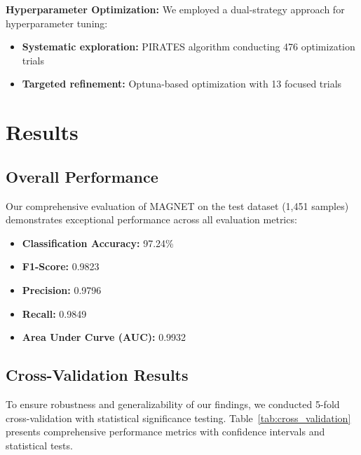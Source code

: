 \documentclass[a4paper,11pt]{article}
\begin{document}
\textbf{Hyperparameter Optimization:}
We employed a dual-strategy approach for hyperparameter tuning:
\begin{itemize}
  \item \textbf{Systematic exploration:} PIRATES algorithm conducting 476 optimization trials
  \item \textbf{Targeted refinement:} Optuna-based optimization with 13 focused trials
\end{itemize}

\section{Results}
\subsection{Overall Performance}
Our comprehensive evaluation of MAGNET on the test dataset (1,451 samples) demonstrates exceptional performance across all evaluation metrics:
\begin{itemize}
    \item \textbf{Classification Accuracy:} 97.24\%
    \item \textbf{F1-Score:} 0.9823
    \item \textbf{Precision:} 0.9796
    \item \textbf{Recall:} 0.9849
    \item \textbf{Area Under Curve (AUC):} 0.9932
\end{itemize}

\subsection{Cross-Validation Results}
To ensure robustness and generalizability of our findings, we conducted 5-fold cross-validation with statistical significance testing. Table~\ref{tab:cross_validation} presents comprehensive performance metrics with confidence intervals and statistical tests.
\end{document}
